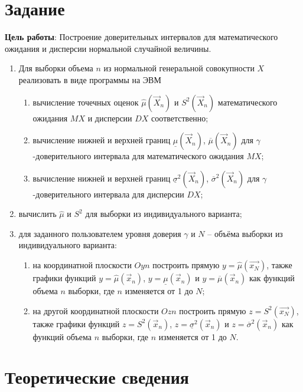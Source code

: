 \chapter*{Задание}

\textbf{Цель работы}: Построение доверительных интервалов для математического ожидания и дисперсии нормальной случайной величины.

\begin{enumerate}
	\item Для выборки объема $n$ из нормальной генеральной совокупности $X$ реализовать в виде программы на ЭВМ
	\begin{enumerate}
		\item вычисление точечных оценок $\hat\mu(\vec X_n)$ и $S^2(\vec X_n)$ математического ожидания $MX$ и дисперсии $DX$ соответственно;
		\item вычисление нижней и верхней границ $\underline\mu(\vec X_n)$, $\overline\mu(\vec X_n)$ для $\gamma$-доверительного интервала для математического ожидания $MX$;
		\item вычисление нижней и верхней границ $\underline\sigma^2(\vec X_n)$, $\overline\sigma^2(\vec X_n)$ для $\gamma$-доверительного интервала для дисперсии $DX$;
	\end{enumerate}
	\item вычислить $\hat\mu$ и $S^2$ для выборки из индивидуального варианта;
	\item для заданного пользователем уровня доверия $\gamma$ и $N$ – объёма выборки из индивидуального варианта:
	\begin{enumerate}
		\item на координатной плоскости $Oyn$ построить прямую $y = \hat\mu(\vec{x_N})$, также графики функций $y = \hat\mu(\vec x_n)$, $y = \underline\mu(\vec x_n)$ и $y = \overline\mu(\vec x_n)$ как функций объема $n$ выборки, где $n$ изменяется от 1 до $N$;
		\item на другой координатной плоскости $Ozn$ построить прямую $z = S^2(\vec{x_N})$, также графики функций $z = S^2(\vec x_n)$, $z = \underline\sigma^2(\vec x_n)$ и $z = \overline\sigma^2(\vec x_n)$ как функций объема $n$ выборки, где $n$ изменяется от 1 до $N$.
	\end{enumerate}
\end{enumerate}

\chapter{Теоретические сведения}

